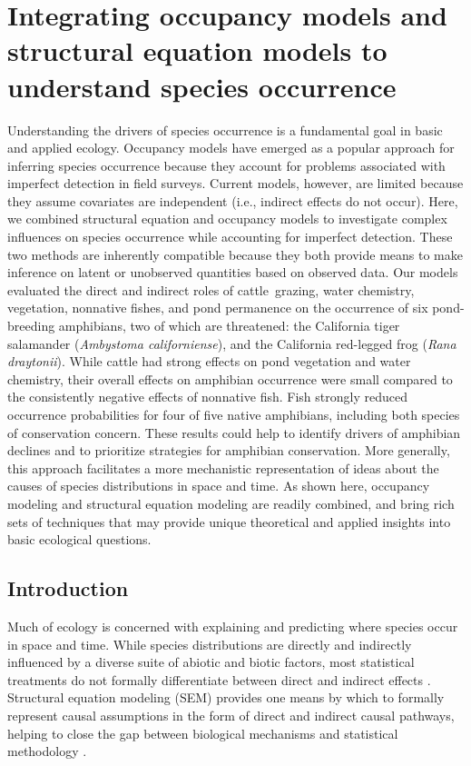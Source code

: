 \chapter{Integrating occupancy models and structural equation models to understand species occurrence}
\label{ch3}

Understanding the drivers of species occurrence is a fundamental goal in
basic and applied ecology. Occupancy models have emerged as a popular
approach for inferring species occurrence because they account for
problems associated with imperfect detection in field surveys. Current
models, however, are limited because they assume covariates are
independent (i.e., indirect effects do not occur). Here, we combined
structural equation and occupancy models to investigate complex
influences on species occurrence while accounting for imperfect
detection. These two methods are inherently compatible because they both
provide means to make inference on latent or unobserved quantities based
on observed data. Our models evaluated the direct and indirect roles of
cattle~grazing, water chemistry, vegetation, nonnative fishes, and pond
permanence on the occurrence of six pond-breeding amphibians, two of
which are threatened: the California tiger salamander (\textit{Ambystoma
californiense}), and the California red-legged frog (\textit{Rana
draytonii}). While cattle had strong effects on pond vegetation and
water chemistry, their overall effects on amphibian occurrence were
small compared to the consistently negative effects of nonnative fish.
Fish strongly reduced occurrence probabilities for four of five native
amphibians, including both species of conservation concern. These
results could help to identify drivers of amphibian declines and to
prioritize strategies for amphibian conservation. More generally, this
approach facilitates a more mechanistic representation of ideas about
the causes of species distributions in space and time. As shown here,
occupancy modeling and structural equation modeling are readily
combined, and bring rich sets of techniques that may provide unique
theoretical and applied insights into basic ecological questions.~

\section{Introduction}

Much of ecology is concerned with explaining and predicting where
species occur in space and time. While species distributions are
directly and indirectly influenced by a diverse suite of abiotic and
biotic factors, most statistical treatments do not formally
differentiate between direct and indirect effects \citep{Guisan2005}. Structural equation modeling (SEM) provides one means by which to
formally represent causal assumptions in the form of direct and indirect
causal pathways, helping to close the gap between biological mechanisms
and statistical methodology \citep{Bollen1989, Grace2006}.

